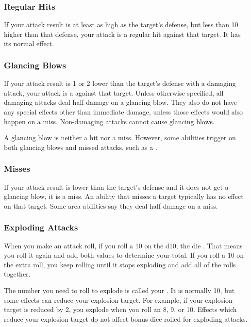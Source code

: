     \subsubsection{Regular Hits}
      If your attack result is at least as high as the target's defense, but less than 10 higher than that defense, your attack is a regular hit against that target.
      It has its normal effect.

    \subsubsection{Glancing Blows}\label{Glancing Blows}
      If your attack result is 1 or 2 lower than the target's defense with a damaging attack, your attack is a  against that target.
      Unless otherwise specified, all damaging attacks deal half damage on a glancing blow.
      They also do not have any special effects other than immediate damage, unless those effects would also happen on a miss.
      Non-damaging attacks cannot cause glancing blows.

      A glancing blow is neither a hit nor a miss.
      However, some abilities trigger on both glancing blows and missed attacks, such as a .

    \subsubsection{Misses}
      If your attack result is lower than the target's defense and it does not get a glancing blow, it is a miss.
      An ability that misses a target typically has no effect on that target.
      Some area abilities say they deal half damage on a miss.

  \subsubsection{Exploding Attacks}\label{Exploding Attacks}
    When you make an attack roll, if you roll a 10 on the d10, the die .
    That means you roll it again and add both values to determine your total.
    If you roll a 10 on the extra roll, you keep rolling until it stops exploding and add all of the rolls together.

    The number you need to roll to explode is called your .
    It is normally 10, but some effects can reduce your explosion target.
    For example, if your explosion target is reduced by 2, you explode when you roll an 8, 9, or 10.
    Effects which reduce your explosion target do not affect bonus dice rolled for exploding attacks.

